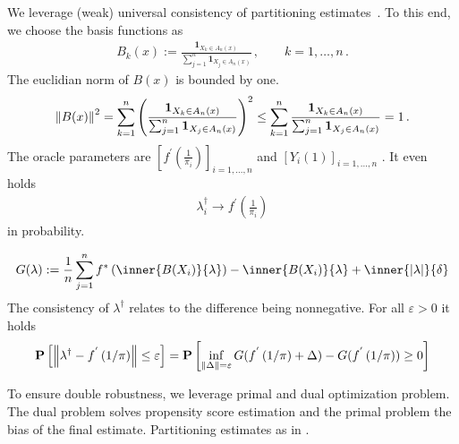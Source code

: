 We leverage (weak) universal consistency
of partitioning estimates~\cite{Gyorfi2002}.
To this end, we choose the basis functions as
\begin{gather}
  B_k(x)
  :=
  \frac{
  \mathbf{1}_{X_k \in A_n(x)}
  }{
  \sum_{j=1}^{n} 
  \mathbf{1}_{X_j \in A_n(x)}
  }
  \,,
  \qquad
  k=
  1,\ldots,n
  \,.
\end{gather}
The euclidian norm of 
$
  B(x)
$
is bounded by one.
\begin{gather}
  \left\lVert B(x)\right\rVert^2
  =
  \sum_{k=1}^{n} 
  \left( 
  \frac{
  \mathbf{1}_{X_k \in A_n(x)}
  }{
  \sum_{j=1}^{n} 
  \mathbf{1}_{X_j \in A_n(x)}
  }
  \right)
  ^2
  \le
  \sum_{k=1}^{n} 
  \frac{
  \mathbf{1}_{X_k \in A_n(x)}
  }{
  \sum_{j=1}^{n} 
  \mathbf{1}_{X_j \in A_n(x)}
  }
  =1
  \,.
\end{gather}
The oracle parameters are
$
  \left[ 
    f^{'}
    \left( 
      \frac{1}{\pi_i}
    \right)
  \right] _ { i = 1,\ldots,n }
$
and
$
  \left[ 
    Y_i(1)
  \right] _ { i = 1,\ldots,n }
$
.
It even holds
\begin{gather}
  \lambda ^ \dagger _ i \to 
    f^{'}
    \left( 
      \frac{1}{\pi_i}
    \right)
\end{gather}
in probability.

 \begin{gather}
   G(\lambda)
   :=
      \frac{1}{n}
      \sum_{j = 1}^{n} 
        f^* 
        \left( 
          \inner
          {B(X_i)}
          {\lambda}
        \right)
      -
          \inner
          {B(X_i)}
          {\lambda}
      +
      \inner
      { | \lambda | }
      { \delta }
 \end{gather} 
 The consistency of 
 $
  \lambda ^ \dagger
 $
 relates to the difference being nonnegative.
 For all 
 $
  \varepsilon > 0
 $
 it holds
 \begin{gather}
   \mathbf{P}
   \left[ 
     \left\lVert
      \lambda ^ \dagger
      -
      f ^ { ' }
      \left( 
        1 / \pi 
      \right)
     \right\rVert
     \le
     \varepsilon
   \right]
   =
   \mathbf{P}
   \left[ 
     \inf _ { \left\lVert\Delta\right\rVert = \varepsilon }
     G
     (
      f ^ { ' }
      \left( 
        1 / \pi 
      \right)
      +
      \Delta
     )
     -
     G
     (
      f ^ { ' }
      \left( 
        1 / \pi 
      \right)
     )
     \ge 
     0
   \right]
 \end{gather}

\begin{takeaways}
  To ensure double robustness, we leverage primal and dual optimization
  problem. The dual problem solves propensity score estimation and the 
  primal problem the bias of the final estimate.
  Partitioning estimates as in \cite{Gyorfi2002}. 
\end{takeaways}

